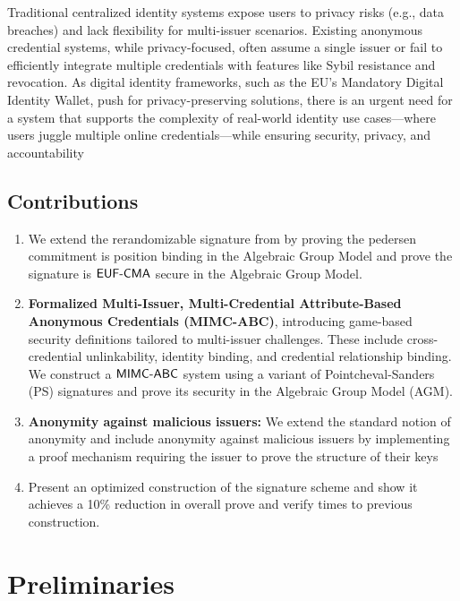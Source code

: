 Traditional centralized identity systems expose users to privacy risks (e.g., data breaches) and lack flexibility for multi-issuer scenarios. Existing anonymous credential systems, while privacy-focused, often assume a single issuer or fail to efficiently integrate multiple credentials with features like Sybil resistance and revocation. As digital identity frameworks, such as the EU’s Mandatory Digital Identity Wallet, push for privacy-preserving solutions, there is an urgent need for a system that supports the complexity of real-world identity use cases—where users juggle multiple online credentials—while ensuring security, privacy, and accountability


\subsection{Contributions}

\begin{enumerate}
    \item We extend the rerandomizable signature from \cite{tomescu2022utt} by proving the pedersen commitment is position binding in the Algebraic Group Model and prove the signature is $\mathsf{EUF\text{-}CMA}$ secure in the Algebraic Group Model. 
    
    \item \textbf{Formalized Multi-Issuer, Multi-Credential Attribute-Based Anonymous Credentials (MIMC-ABC)}, introducing game-based security definitions tailored to multi-issuer challenges. These include cross-credential unlinkability, identity binding, and credential relationship binding. We construct a $\mathsf{MIMC\text{-}ABC}$ system using a variant of Pointcheval-Sanders (PS) signatures and prove its security in the Algebraic Group Model (AGM). 

    \item \textbf{Anonymity against malicious issuers:} We extend the standard notion of anonymity and include anonymity against malicious issuers by implementing a proof mechanism requiring the issuer to prove the structure of their keys 

    \item Present an optimized construction of the signature scheme and show it achieves a 10\% reduction in overall prove and verify times to previous construction. 

\end{enumerate}





\section{Preliminaries}

